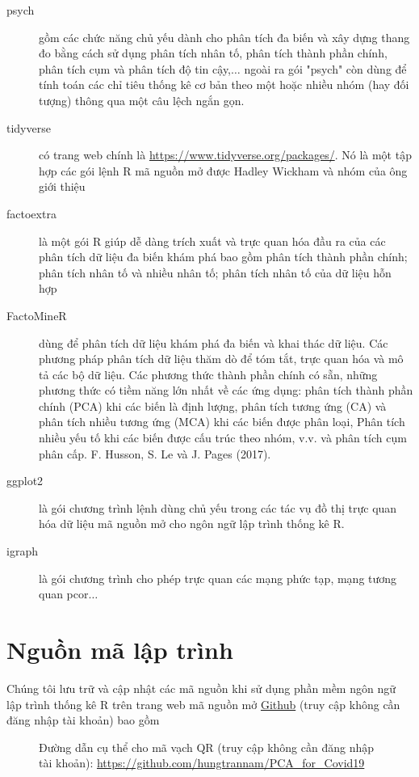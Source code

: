 \documentclass[../thesis.tex]{subfiles}
\begin{document}
\begin{description}
	\item[psych] gồm các chức năng chủ yếu dành cho phân tích đa biến và xây dựng thang đo bằng cách sử dụng phân tích nhân tố, phân tích thành phần chính, phân tích cụm và phân tích độ tin cậy,$ \ldots $ ngoài ra gói "psych" còn dùng để tính toán các chỉ tiêu thống kê cơ bản theo một hoặc nhiều nhóm (hay đối tượng) thông qua một câu lệch ngắn gọn.
	\item[tidyverse] có trang web chính là \url{https://www.tidyverse.org/packages/}. Nó là một tập hợp các gói lệnh R mã nguồn mở được Hadley Wickham và nhóm của ông giới thiệu
	\item[factoextra] là một gói R giúp dễ dàng trích xuất và trực quan hóa đầu ra của các phân tích dữ liệu đa biến khám phá bao gồm phân tích thành phần chính; phân tích nhân tố và nhiều nhân tố; phân tích nhân tố của dữ liệu hỗn hợp 
	\item[FactoMineR] dùng để phân tích dữ liệu khám phá đa biến và khai thác dữ liệu. Các phương pháp phân tích dữ liệu thăm dò để tóm tắt, trực quan hóa và mô tả các bộ dữ liệu. Các phương thức thành phần chính có sẵn, những phương thức có tiềm năng lớn nhất về các ứng dụng: phân tích thành phần chính (PCA) khi các biến là định lượng, phân tích tương ứng (CA) và phân tích nhiều tương ứng (MCA) khi các biến được phân loại, Phân tích nhiều yếu tố khi các biến được cấu trúc theo nhóm, v.v. và phân tích cụm phân cấp. F. Husson, S. Le và J. Pages (2017).
	
	\item[ggplot2] là gói chương trình lệnh dùng chủ yếu trong các tác vụ đồ thị trực quan hóa dữ liệu mã nguồn mở cho ngôn ngữ lập trình thống kê R.
	\item[igraph] là gói chương trình cho phép trực quan các mạng phức tạp, mạng tương quan pcor$\ldots$
\end{description}
	
	
	\section{Nguồn mã lập trình}
Chúng tôi lưu trữ và cập nhật các mã nguồn khi sử dụng phần mềm ngôn ngữ lập trình thống kê R trên trang web mã nguồn mở \href{https://github.com/hungtrannam/PCA_for_Covid19}{Github} (truy cập không cần đăng nhập tài khoản) bao gồm

\begin{SCfigure}
	\centering
	\caption[Đường dẫn cụ thể cho mã vạch QR]{Đường dẫn cụ thể cho mã vạch QR (truy cập không cần đăng nhập tài khoản): \url{https://github.com/hungtrannam/PCA_for_Covid19}}
\end{SCfigure}
	
\end{document}
